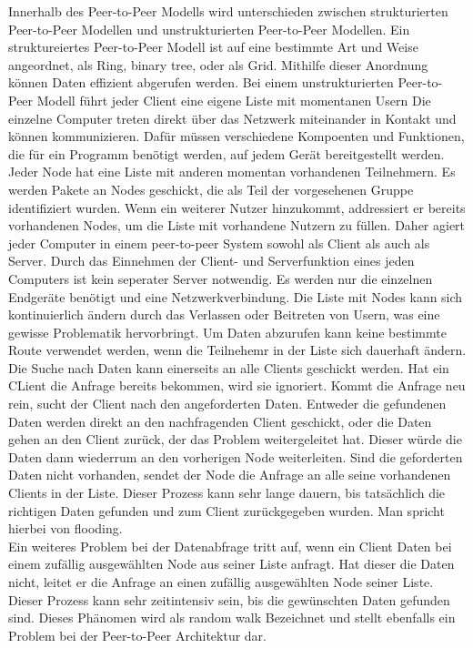 Innerhalb des Peer-to-Peer Modells wird unterschieden zwischen strukturierten Peer-to-Peer Modellen und unstrukturierten Peer-to-Peer Modellen.
Ein struktureiertes Peer-to-Peer Modell ist auf eine bestimmte Art und Weise angeordnet, als Ring, binary tree, oder als Grid. Mithilfe dieser Anordnung können Daten effizient abgerufen werden.
Bei einem unstrukturierten Peer-to-Peer Modell führt jeder Client eine eigene Liste mit momentanen Usern\cite[S. 92]{steen23}
Die einzelne Computer treten direkt über das Netzwerk miteinander in Kontakt und können kommunizieren.
Dafür müssen verschiedene Kompoenten und Funktionen, die für ein Programm benötigt werden, auf jedem Gerät bereitgestellt werden.
Jeder Node hat eine Liste mit anderen momentan vorhandenen Teilnehmern.
Es werden Pakete an Nodes geschickt, die als Teil der vorgesehenen Gruppe identifiziert wurden. 
Wenn ein weiterer Nutzer hinzukommt, addressiert er bereits vorhandenen Nodes, um die Liste mit vorhandene Nutzern zu füllen.
Daher agiert jeder Computer in einem peer-to-peer System sowohl als Client als auch als Server.
Durch das Einnehmen der Client- und Serverfunktion eines jeden Computers ist kein seperater Server notwendig.
Es werden nur die einzelnen Endgeräte benötigt und eine Netzwerkverbindung\cite{tan10}.
Die Liste mit Nodes kann sich kontinuierlich ändern durch das Verlassen oder Beitreten von Usern, was eine gewisse Problematik hervorbringt.
Um Daten abzurufen kann keine bestimmte Route verwendet werden, wenn die Teilnehemr in der Liste sich dauerhaft ändern.
Die Suche nach Daten kann einerseits an alle Clients geschickt werden. Hat ein CLient die Anfrage bereits bekommen, wird sie ignoriert.
Kommt die Anfrage neu rein, sucht der Client nach den angeforderten Daten. Entweder die gefundenen Daten werden direkt an den nachfragenden Client geschickt, oder die Daten gehen an den Client zurück, der das Problem weitergeleitet hat.
Dieser würde die Daten dann wiederrum an den vorherigen Node weiterleiten. 
Sind die geforderten Daten nicht vorhanden, sendet der Node die Anfrage an alle seine vorhandenen Clients in der Liste.
Dieser Prozess kann sehr lange dauern, bis tatsächlich die richtigen Daten gefunden und zum Client zurückgegeben wurden.
Man spricht hierbei von flooding\cite[S. 93]{steen23}.
\\
Ein weiteres Problem bei der Datenabfrage tritt auf, wenn ein Client Daten bei einem zufällig ausgewählten Node aus seiner Liste anfragt.
Hat dieser die Daten nicht, leitet er die Anfrage an einen zufällig ausgewählten Node seiner Liste. Dieser Prozess kann sehr zeitintensiv sein, bis die gewünschten Daten gefunden sind.
Dieses Phänomen wird als random walk Bezeichnet und stellt ebenfalls ein Problem bei der Peer-to-Peer Architektur dar.

